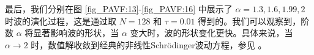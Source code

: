   最后，我们分别在图 \ref{fig_PAVF:13}-\ref{fig_PAVF:16} 中展示了 $\alpha=1.3,1.6,1.99,2$ 时波的演化过程，这是通过取 $N=128$ 和 $\tau=0.01$ 得到的。我们可以观察到，阶数 $\alpha$ 将显著影响波的形状，当 $\alpha$ 变大时，波的形状变化更快。具体来说，当 $\alpha \rightarrow 2$ 时，数值解收敛到经典的非线性Schr{\"o}dinger波动方程，参见 \cite{zhangConservativeNumericalScheme2003,liCompactFiniteDifference2012,wangAnalysisNewConservative2006}。

  \begin{figure}[H]
	\begin{center}
	  \\
\end{center}
\end{figure}
